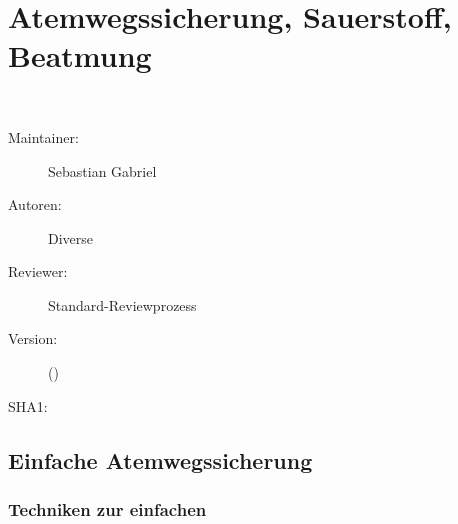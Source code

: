 % 
% 
% 

\def\ChapterCode{ASB}
\chapter
[\CO{[ASB]} Atemwegssicherung, Sauerstoff, Beatmung]
{Atemwegssicherung, Sauerstoff, Beatmung}
\ChapterIntro
{%
~~~
}
{%
\begin{description}
  \item[Maintainer:] Sebastian Gabriel
  \item[Autoren:] Diverse
  \item[Reviewer:] Standard-Reviewprozess
  \item[Version:] {\VarDocVersionTypeName} ({\VarDocVersionTypeDescription})
  \item[SHA1:] {\DocGitCommit}
\end{description}

{\TxTeilkapitelAASS}
}
\label{chp:ASB}
\clearpage



\section{Einfache Atemwegssicherung}

\subsection{ Techniken zur einfachen }

